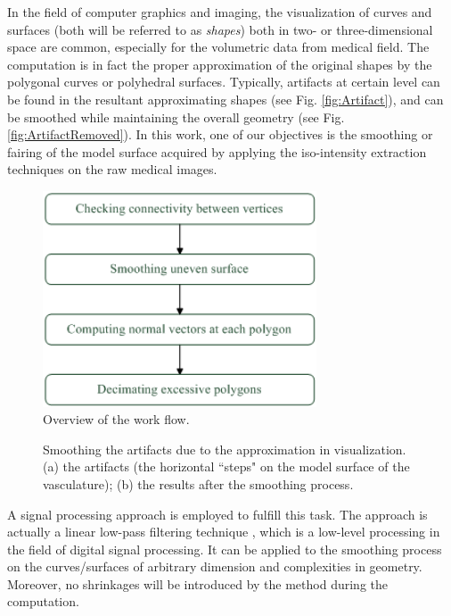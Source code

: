 In the field of computer graphics and imaging, the visualization of curves and surfaces (both will be referred to as \emph{shapes}) both in two- or three-dimensional space are common, especially for the volumetric data from medical field. %
The computation is in fact the proper approximation of the original shapes by the polygonal curves or polyhedral surfaces.
Typically, artifacts at certain level can be found in the resultant approximating shapes (see Fig. \ref{fig:Artifact}), and can be smoothed while maintaining the overall geometry (see Fig. \ref{fig:ArtifactRemoved}). %
In this work, one of our objectives is the smoothing or fairing of the model surface acquired by applying the iso-intensity extraction techniques on the raw medical images.
\begin{figure}[t]
\centering
\includegraphics[width=3.2in]{Figures/chap06/DataFlow.png}
\caption{Overview of the work flow.}
\label{fig:DataFlow}
\end{figure}
\begin{figure}[t]
\centering
{}
\hfil
{}
\caption{Smoothing the artifacts due to the approximation in visualization. (a) the artifacts (the horizontal ``steps" on the model surface of the vasculature); (b) the results after the smoothing process.}%
\label{fig:ArtifactComparison}
\end{figure}
A signal processing approach is employed to fulfill this task.
The approach is actually a linear low-pass filtering technique \cite{Taubin1995ICCV}, which is a low-level processing in the field of digital signal processing.
It can be applied to the smoothing process on the curves/surfaces of arbitrary dimension and complexities in geometry.
Moreover, no shrinkages will be introduced by the method during the computation.

